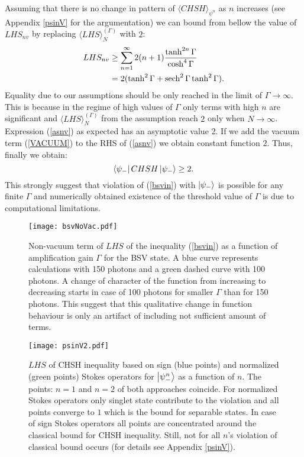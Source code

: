 \documentclass[aps,pra, twocolumn, showpacs]{revtex4-2}
\newcommand{\mz}[1]{{\color{red} #1}}
\begin{document}
Assuming that there is no change in pattern of  $\langle CHSH\rangle_{\psi^n}$ as $n$  increases (see Appendix \ref{psinV} for the argumentation) we can bound from bellow the value of $LHS_{nv}$ by replacing $\langle LHS \rangle_N^{(\Gamma)}$ with $2$:
\begin{align}
\begin{split}
LHS_{nv}&\geq\sum_{n=1}^\infty 2(n+1)\frac{\tanh^{2n}{\Gamma}}{\cosh^4{\Gamma}}\\
&=2(\tanh^2{\Gamma}+\sech^2{\Gamma}\tanh^2{\Gamma}).\label{asnv}
\end{split}
\end{align}
Equality due to our assumptions should be only reached in the limit of $\Gamma\rightarrow\infty$. This is because in the regime of high values of $\Gamma$ only terms with high $n$ are significant and $\langle LHS \rangle_N^{(\Gamma)}$ from the assumption reach $2$ only when $N\rightarrow\infty$. Expression (\ref{asnv}) as expected has an asymptotic value 2. If we add the vacuum term (\ref{VACUUM}) to the RHS of (\ref{asnv}) we obtain constant function $2$. Thus, finally we obtain:
\begin{equation}
    \bra{\psi_-}CHSH\ket{\psi_-}\geq 2.
\end{equation}
This strongly suggest that violation of (\ref{bsvin}) with $\ket{\psi_-}$ is possible for any finite $\Gamma$ and numerically obtained existence of the threshold value of $\Gamma$ is due to computational limitations.





\begin{figure}[h!]
\centering
\texttt{[image: bsvNoVac.pdf]} 
\caption{Non-vacuum term of $LHS$ of the inequality (\ref{bsvin}) as a function of amplification gain  $\Gamma$ for the BSV state. A blue curve represents calculations with 150 photons and a green dashed curve with 100 photons. A change of character of the function from increasing to decreasing starts in case of 100 photons for smaller $\Gamma$ than for 150 photons. This suggest that this qualitative change in function behaviour is only an artifact of including not sufficient amount of terms.}
\label{bsv2}
\end{figure}
\begin{figure}[h!]
\centering
\texttt{[image: psinV2.pdf]} 
\caption{  $LHS$ of CHSH inequality based on sign (blue points) and  normalized (green points) Stokes operators for $\ket{\psi^n_-}$ as a function of $n$.
The  points: $n=1$  and $n=2$ of both approaches coincide. For normalized Stokes operators  only singlet state contribute to the violation and all points  converge to $1$ which is the bound for separable states. In case of sign Stokes operators  all points are concentrated around  the classical bound for CHSH inequality. Still, not for all $n$'s violation of classical bound occurs (for details see Appendix \ref{psinV}).  
}\label{psi}
\end{figure}
\end{document}
